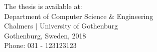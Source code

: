 \documentclass[10pt,a4paper,onecolumn,english]{book}
\newcommand{\currentyear}{2018}
\begin{document}
\begin{center}
The thesis is available at:\\
Department of Computer Science \& Engineering\\
Chalmers $|$ University of Gothenburg\\
Gothenburg, Sweden, \currentyear\\
\vspace{1cm}
Phone: 031 - 123123123
\end{center}


\newpage
\thispagestyle{empty}


\end{document}

